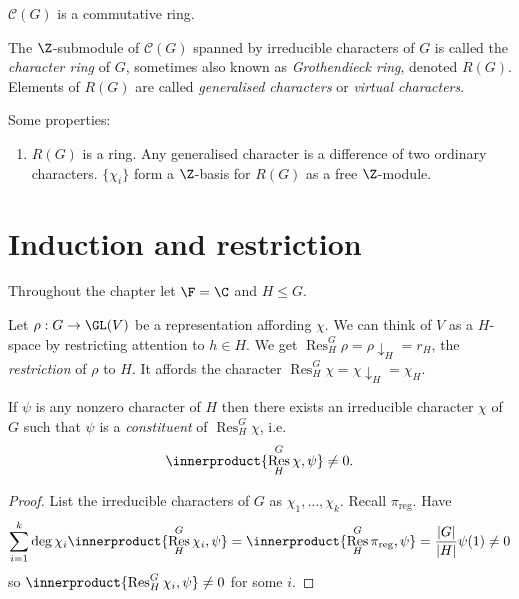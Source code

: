\documentclass[a4paper]{article}
\newcommand*{\ip}{\innerproduct} %
\DeclareMathOperator{\Res}{Res} %
\theoremstyle{definition}
\begin{document}
\(\mathcal C(G)\) is a commutative ring.

\begin{definition}
  The \(\Z\)-submodule of \(\mathcal C(G)\) spanned by irreducible characters of \(G\) is called the \emph{character ring} of \(G\), sometimes also known as \emph{Grothendieck ring}, denoted \(R(G)\). Elements of \(R(G)\) are called \emph{generalised characters} or \emph{virtual characters}.
\end{definition}

Some properties:
\begin{enumerate}
\item \(R(G)\) is a ring. Any generalised character is a difference of two ordinary characters. \(\{\chi_i\}\) form a \(\Z\)-basis for \(R(G)\) as a free \(\Z\)-module.
\end{enumerate}

\section{Induction and restriction}

Throughout the chapter let \(\F = \C\) and \(H \leq G\).

\begin{definition}[restriction]
  Let \(\rho: G \to \GL(V)\) be a representation affording \(\chi\). We can think of \(V\) as a \(H\)-space by restricting attention to \(h \in H\). We get \(\Res^G_H \rho = \rho \downarrow_H = r_H\), the \emph{restriction} of \(\rho\) to \(H\). It affords the character \(\Res^G_H \chi = \chi \downarrow_H = \chi_H\).
\end{definition}

\begin{lemma}
  If \(\psi\) is any nonzero character of \(H\) then there exists an irreducible character \(\chi\) of \(G\) such that \(\psi\) is a \emph{constituent} of \(\Res_H^G \chi\), i.e.
  \[
    \ip{\Res_H^G \chi, \psi} \neq 0.
  \]
\end{lemma}

\begin{proof}
  List the irreducible characters of \(G\) as \(\chi_1, \dots, \chi_k\). Recall \(\pi_{\text{reg}}\). Have
  \[
    \sum_{i = 1}^k \deg \chi_i \ip{\Res_H^G \chi_i, \psi}
    = \ip{\Res_H^G \pi_{\text{reg}}, \psi}
    = \frac{|G|}{|H|} \psi(1)
    \neq 0
  \]
  so \(\ip{\Res_H^G \chi_i, \psi} \neq 0\) for some \(i\).
\end{proof}
\end{document}
